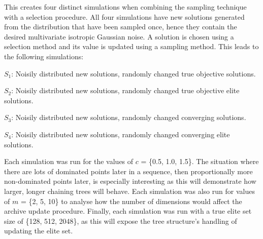 \documentclass{ecmm427_assignment}
\begin{document}
This creates four distinct simulations when combining the sampling technique with a selection procedure. All four simulations have new solutions generated from the distribution that have been sampled once, hence they contain the desired multivariate isotropic Gaussian noise.
A solution is chosen using a selection method and its value is updated using a sampling method. This leads to the following simulations:

\begin{description}
    \item $S_1$: Noisily distributed new solutions, randomly changed true objective solutions.
    \item $S_2$: Noisily distributed new solutions, randomly changed true objective elite solutions.
    \item $S_3$: Noisily distributed new solutions, randomly changed converging solutions.
    \item $S_4$: Noisily distributed new solutions, randomly changed converging elite solutions.
\end{description}

Each simulation was run for the values of $c$ = \{0.5, 1.0, 1.5\}. The situation where there are lots of dominated points later in a sequence, then proportionally more non-dominated points later, is especially interesting as this will demonstrate how larger, longer chaining trees will behave.
Each simulation was also run for values of $m$ = \{2, 5, 10\} to analyse how the number of dimensions would affect the archive update procedure.
Finally, each simulation was run with a true elite set size of \{128, 512, 2048\}, as this will expose the tree structure's handling of updating the elite set.
\end{document}
